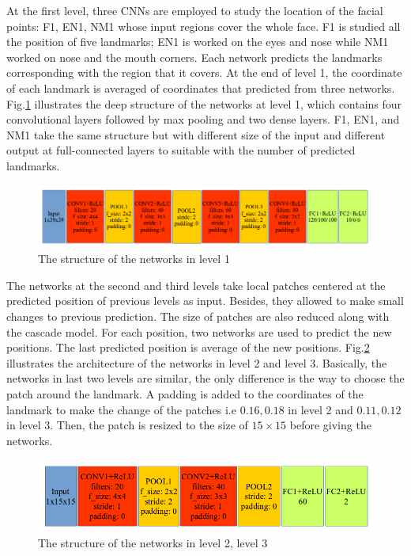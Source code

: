 \documentclass[12pt,a4paper]{article}
\begin{document}
At the first level, three CNNs are employed to study the location of the facial points: F1, EN1, NM1 whose input regions cover the whole face. F1 is studied all the position of five landmarks; EN1 is worked on the eyes and nose while NM1 worked on nose and the mouth corners. Each network predicts the landmarks corresponding with the region that it covers. At the end of level 1, the coordinate of each landmark is averaged of coordinates that predicted from three networks. Fig.\ref{1Fconv} illustrates the deep structure of the networks at level 1, which contains four convolutional layers followed by max pooling and two dense layers. F1, EN1, and NM1 take the same structure but with different size of the input and different output at full-connected layers to suitable with the number of predicted landmarks.
\begin{figure}[h]
	\centering
	\includegraphics[scale=0.5]{images/cnn_level1}
	\caption{The structure of the networks in level 1}
	\label{1Fconv}
\end{figure}

The networks at the second and third levels take local patches centered at the predicted position of previous levels as input. Besides, they allowed to make small changes to previous prediction. The size of patches are also reduced along with the cascade model. For each position, two networks are used to predict the new positions. The last predicted position is average of the new positions. Fig.\ref{2lvconv} illustrates the architecture of the networks in level 2 and level 3. Basically, the networks in last two levels are similar, the only difference is the way to choose the patch around the landmark. A padding is added to the coordinates of the landmark to make the change of the patches i.e $0.16, 0.18$ in level 2 and $0.11, 0.12$ in level 3. Then, the patch is resized to the size of $15 \times 15$ before giving the networks.
\begin{figure}[h]
	\centering
	\includegraphics[scale=0.5]{images/cnn_level2}
	\caption{The structure of the networks in level 2, level 3}
	\label{2lvconv}
\end{figure}
\end{document}
